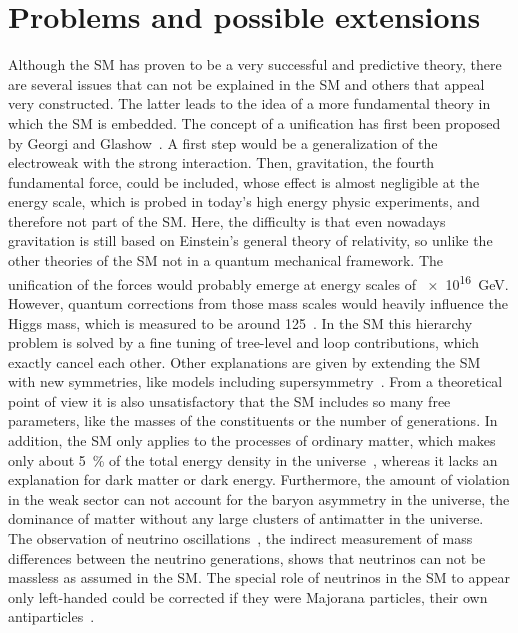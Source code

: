 
\section{Problems and possible extensions}
\label{sec:standardmodel:extensions}

Although the SM has proven to be a very successful and predictive theory,
there are several issues that can not be explained in the SM and others that
appeal very constructed. The latter leads to the idea of a more fundamental
theory in which the SM is embedded. The concept of a unification has first
been proposed by Georgi and Glashow~\cite{Georgi:1974sy}. A first step would
be a generalization of the electroweak with the strong interaction. Then,
gravitation, the fourth fundamental force, could be included, whose effect is
almost negligible at the energy scale, which is probed in today's high energy
physic experiments, and therefore not part of the SM. Here, the difficulty is
that even nowadays gravitation is still based on Einstein's general theory of
relativity, so unlike the other theories of the SM not in a quantum mechanical
framework. The unification of the forces would probably emerge at energy
scales of \SI{e16}{\GeV}. However, quantum corrections from those mass scales
would heavily influence the Higgs mass, which is measured to be around
\SI{125}{\GeVcc}~\cite{HiggsMass}. In the SM this hierarchy problem is
solved by a fine tuning of tree-level and loop contributions, which exactly
cancel each other. Other explanations are given by extending the SM with new
symmetries, like models including
supersymmetry~\cite{Gervais:1971ji,Golfand:1971iw,Volkov:1972jx,*Volkov:1973ix}.
From a theoretical point of view it is also unsatisfactory that the SM
includes so many free parameters, like the masses of the constituents or the
number of generations. In addition, the SM only applies to the processes of
ordinary matter, which makes only about \SI{5}{\percent} of the total energy
density in the universe~\cite{Ade:2015xua}, whereas it lacks an explanation
for dark matter or dark energy. Furthermore, the amount of \CP violation in
the weak sector can not account for the baryon asymmetry in the universe, \ie
the dominance of matter without any large clusters of antimatter in the
universe. The observation of neutrino
oscillations~\cite{Fukuda:1998mi,Ahmad:2001an,*Ahmad:2002jz}, \ie the indirect
measurement of mass differences between the neutrino generations, shows that
neutrinos can not be massless as assumed in the SM. The special role of
neutrinos in the SM to appear only left-handed could be corrected if they were
Majorana particles, \ie their own antiparticles~\cite{Majorana:1937vz}.
